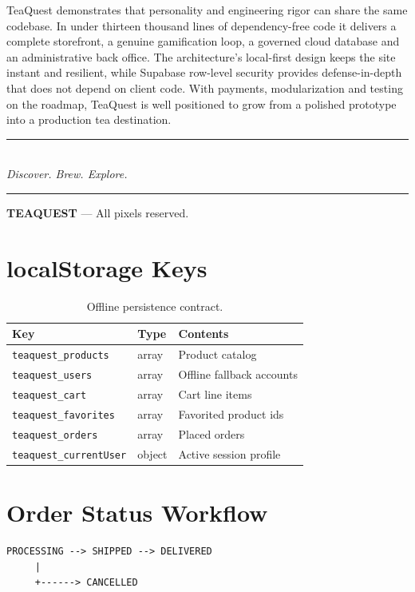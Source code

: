 \documentclass[11pt,a4paper]{article}
\begin{document}
TeaQuest demonstrates that personality and engineering rigor can share the
same codebase. In under thirteen thousand lines of dependency-free code it
delivers a complete storefront, a genuine gamification loop, a governed
cloud database and an administrative back office. The architecture's
local-first design keeps the site instant and resilient, while Supabase
row-level security provides defense-in-depth that does not depend on client
code. With payments, modularization and testing on the roadmap, TeaQuest is
well positioned to grow from a polished prototype into a production tea
destination.

\vspace{0.5cm}
\begin{center}
    {\color{teagreen}\rule{0.5\linewidth}{1pt}}\\[6pt]
    \textit{Discover. Brew. Explore.}\\[4pt]
    {\color{teagreen}\rule{6pt}{6pt}}\;
    \textbf{TEAQUEST} --- All pixels reserved.
\end{center}


\appendix

\section{localStorage Keys}

\begin{table}[h!]
\centering
\caption{Offline persistence contract.}
\begin{tabular}{@{}lll@{}}
\toprule
\textbf{Key} & \textbf{Type} & \textbf{Contents} \\
\midrule
\texttt{teaquest\_products}    & array  & Product catalog \\
\texttt{teaquest\_users}       & array  & Offline fallback accounts \\
\texttt{teaquest\_cart}        & array  & Cart line items \\
\texttt{teaquest\_favorites}   & array  & Favorited product ids \\
\texttt{teaquest\_orders}      & array  & Placed orders \\
\texttt{teaquest\_currentUser} & object & Active session profile \\
\bottomrule
\end{tabular}
\end{table}

\section{Order Status Workflow}

\begin{lstlisting}[language={},caption={Allowed transitions managed from the admin dashboard.}]
PROCESSING --> SHIPPED --> DELIVERED
     |
     +------> CANCELLED
\end{lstlisting}
\end{document}
